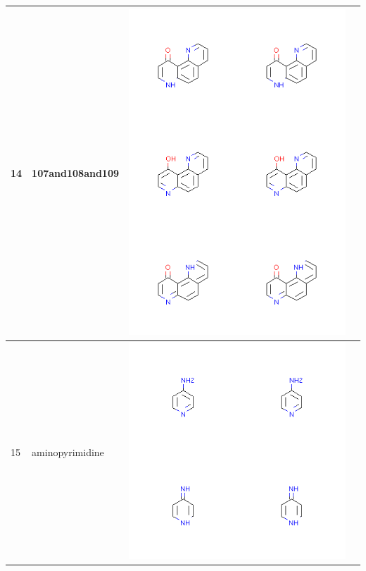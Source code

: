 \begin{longtable}{|l|l|l|l|}
\hline
14 & 107and108and109 & \includegraphics[scale=0.6]{107and108and109.png} & \\
\hline
15 & aminopyrimidine & \includegraphics[scale=0.6]{aminopyrimidine.png} & \\

\end{longtable}
